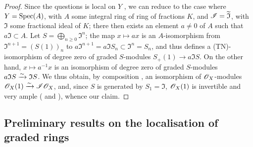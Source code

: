 \begin{proof}
Since the questions is local on $Y$ , we can reduce to the case where $Y=\operatorname{Spec}(A)$, with $A$ some integral ring of ring of fractions $K$, and $\mathscr{I}=\widetilde{\mathfrak{I}}$, with $\mathfrak{I}$ some fractional ideal of $K$;
there then exists an element $a\neq0$ of $A$ such that $a\mathfrak{I}\subset A$.
Let $S = \bigoplus_{n\geq0}\mathfrak{I}^n$;
the map $x\mapsto ax$ is an $A$-isomorphism from $\mathfrak{I}^{n+1} = (S(1))_n$ to $a\mathfrak{I}^{n+1} = a\mathfrak{I}S_n \subset \mathfrak{I}^n = S_n$,
and thus defines a (TN)-isomorphism of degree zero of graded $S$-modules $S_+(1)\to a\mathfrak{I}S$.
On the other hand, $x\mapsto a^{-1}x$ is an isomorphism of degree zero of graded $S$-modules $a\mathfrak{I}S \xrightarrow{\sim} \mathfrak{I}S$.
We thus obtain, by composition , an isomorphism of $\mathscr{O}_X$-modules $\mathscr{O}_X(1) \xrightarrow{\sim} \mathscr{I}\mathscr{O}_X$, and, since $S$ is generated by $S_1=\mathfrak{I}$, $\mathscr{O}_X(1)$ is invertible  and very ample ( and ), whence our claim.
\end{proof}


\subsection{Preliminary results on the localisation of graded rings}
\label{subsection:II.8.2}

